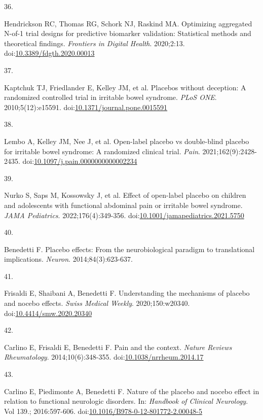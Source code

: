 \documentclass[
  11pt,
]{article}
\newlength{\cslhangindent}
\newlength{\csllabelwidth}
\newenvironment{CSLReferences}[2] %
 {\begin{list}{}{%
  \setlength{\itemindent}{0pt}
  \setlength{\leftmargin}{0pt}
  \setlength{\parsep}{0pt}
  \ifodd #1
   \setlength{\leftmargin}{\cslhangindent}
   \setlength{\itemindent}{-1\cslhangindent}
  \fi
  \setlength{\itemsep}{#2\baselineskip}}}
 {\end{list}}
\newcommand{\CSLLeftMargin}[1]{\parbox[t]{\csllabelwidth}{\strut#1\strut}}
\newcommand{\CSLRightInline}[1]{\parbox[t]{\linewidth - \csllabelwidth}{\strut#1\strut}}
\begin{document}
\begin{CSLReferences}{0}{1}
\CSLLeftMargin{36. }%
\CSLRightInline{Hendrickson RC, Thomas RG, Schork NJ, Raskind MA. Optimizing aggregated {N}-of-1 trial designs for predictive biomarker validation: Statistical methods and theoretical findings. \emph{Frontiers in Digital Health}. 2020;2:13. doi:\href{https://doi.org/10.3389/fdgth.2020.00013}{10.3389/fdgth.2020.00013}}

\CSLLeftMargin{37. }%
\CSLRightInline{{Kaptchuk TJ, Friedlander E, Kelley JM, et al.} Placebos without deception: A randomized controlled trial in irritable bowel syndrome. \emph{PLoS ONE}. 2010;5(12):e15591. doi:\href{https://doi.org/10.1371/journal.pone.0015591}{10.1371/journal.pone.0015591}}

\CSLLeftMargin{38. }%
\CSLRightInline{{Lembo A, Kelley JM, Nee J, et al.} Open-label placebo vs double-blind placebo for irritable bowel syndrome: A randomized clinical trial. \emph{Pain}. 2021;162(9):2428-2435. doi:\href{https://doi.org/10.1097/j.pain.0000000000002234}{10.1097/j.pain.0000000000002234}}

\CSLLeftMargin{39. }%
\CSLRightInline{Nurko S, Saps M, Kossowsky J, et al. Effect of open-label placebo on children and adolescents with functional abdominal pain or irritable bowel syndrome. \emph{JAMA Pediatrics}. 2022;176(4):349-356. doi:\href{https://doi.org/10.1001/jamapediatrics.2021.5750}{10.1001/jamapediatrics.2021.5750}}

\CSLLeftMargin{40. }%
\CSLRightInline{Benedetti F. Placebo effects: From the neurobiological paradigm to translational implications. \emph{Neuron}. 2014;84(3):623-637.}

\CSLLeftMargin{41. }%
\CSLRightInline{Frisaldi E, Shaibani A, Benedetti F. Understanding the mechanisms of placebo and nocebo effects. \emph{Swiss Medical Weekly}. 2020;150:w20340. doi:\href{https://doi.org/10.4414/smw.2020.20340}{10.4414/smw.2020.20340}}

\CSLLeftMargin{42. }%
\CSLRightInline{Carlino E, Frisaldi E, Benedetti F. Pain and the context. \emph{Nature Reviews Rheumatology}. 2014;10(6):348-355. doi:\href{https://doi.org/10.1038/nrrheum.2014.17}{10.1038/nrrheum.2014.17}}

\CSLLeftMargin{43. }%
\CSLRightInline{Carlino E, Piedimonte A, Benedetti F. Nature of the placebo and nocebo effect in relation to functional neurologic disorders. In: \emph{Handbook of Clinical Neurology}. Vol 139.; 2016:597-606. doi:\href{https://doi.org/10.1016/B978-0-12-801772-2.00048-5}{10.1016/B978-0-12-801772-2.00048-5}}


\end{CSLReferences}
\end{document}
